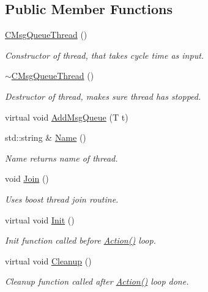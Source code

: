 \subsection*{Public Member Functions}
\begin{DoxyCompactItemize}
\item 
\hyperlink{classRCS_1_1CMsgQueueThread_a0dcb508f3c9faf6ec731bb09578f36e0}{C\-Msg\-Queue\-Thread} ()
\begin{DoxyCompactList}\small\item\em Constructor of thread, that takes cycle time as input. \end{DoxyCompactList}\item 
\hyperlink{classRCS_1_1CMsgQueueThread_ae3ae4576c24fb0c251dd3e5d6db599f3}{$\sim$\-C\-Msg\-Queue\-Thread} ()
\begin{DoxyCompactList}\small\item\em Destructor of thread, makes sure thread has stopped. \end{DoxyCompactList}\item 
virtual void \hyperlink{classRCS_1_1CMsgQueueThread_a84524d066ef68e616d16f53e0f5ff73a}{Add\-Msg\-Queue} (T t)
\item 
std\-::string \& \hyperlink{classRCS_1_1CMsgQueueThread_a2855d2560980c4a734781dc81314cb54}{Name} ()
\begin{DoxyCompactList}\small\item\em Name returns name of thread. \end{DoxyCompactList}\item 
void \hyperlink{classRCS_1_1CMsgQueueThread_ae97cebd1e3f04d7b302de5c9a186fffa}{Join} ()
\begin{DoxyCompactList}\small\item\em Uses boost thread join routine. \end{DoxyCompactList}\item 
virtual void \hyperlink{classRCS_1_1CMsgQueueThread_a43d2b0e9a8811115d2fd805c7291d676}{Init} ()
\begin{DoxyCompactList}\small\item\em Init function called before \hyperlink{classRCS_1_1CMsgQueueThread_ac348fb5db221c3a6502a15f60963e047}{Action()} loop. \end{DoxyCompactList}\item 
virtual void \hyperlink{classRCS_1_1CMsgQueueThread_a602660a933db171f91f52531fbff0fcf}{Cleanup} ()
\begin{DoxyCompactList}\small\item\em Cleanup function called after \hyperlink{classRCS_1_1CMsgQueueThread_ac348fb5db221c3a6502a15f60963e047}{Action()} loop done. \end{DoxyCompactList}\item 

\end{DoxyCompactItemize}
